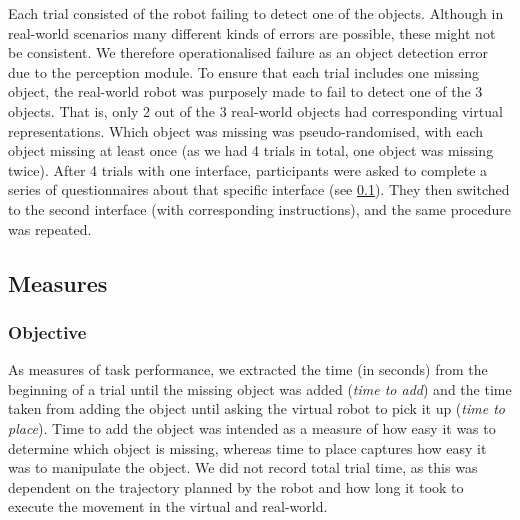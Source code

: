 \documentclass[letterpaper, 10 pt, conference]{ieeeconf}  %
\begin{document}
Each trial consisted of the robot failing to detect one of the objects. Although in real-world scenarios many different kinds of errors are possible, these might not be consistent. We therefore operationalised failure as an object detection error due to the perception module. To ensure that each trial includes one missing object, the real-world robot was purposely made to fail to detect one of the 3 objects. That is, only 2 out of the 3 real-world objects had corresponding virtual representations. Which object was missing was pseudo-randomised, with each object missing at least once (as we had 4 trials in total, one object was missing twice). After 4 trials with one interface, participants were asked to complete a series of questionnaires about that specific interface (see \cref{sec:measures}). They then switched to the second interface (with corresponding instructions), and the same procedure was repeated. 







\subsection{Measures}
\label{sec:measures}
\subsubsection{Objective}
As measures of task performance, we extracted the time (in seconds) from the beginning of a trial until the missing object was added (\textit{time to add}) and the time taken from adding the object until asking the virtual robot to pick it up (\textit{time to place}). Time to add the object was intended as a measure of how easy it was to determine which object is missing, whereas time to place captures how easy it was to manipulate the object. We did not record total trial time, as this was dependent on the trajectory planned by the robot and how long it took to execute the movement in the virtual and real-world. 
\end{document}
